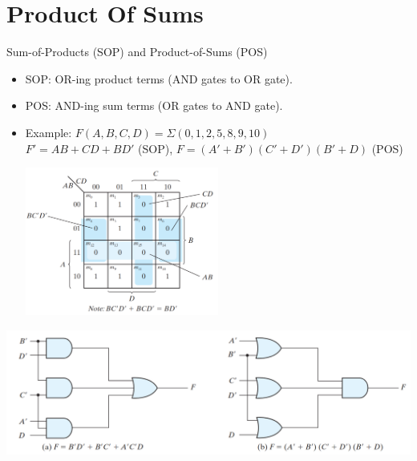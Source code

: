 \documentclass[Serif, 10pt, brown]{beamer}
\theoremstyle{example}
\theoremstyle{plain}
\begin{document}
\section[Product Of Sums]{Product Of Sums}
\begin{frame}{Sum-of-Products (SOP) and Product-of-Sums (POS)}
    \begin{itemize}
        \item SOP: OR-ing product terms (AND gates to OR gate).
        \item POS: AND-ing sum terms (OR gates to AND gate).
        \item Example: \( F(A,B,C,D) = \Sigma(0,1,2,5,8,9,10)\)\\\( F' = AB+CD+BD' \) (SOP), \( F = (A' + B') (C' + D' )(B'+D) \) (POS)
        \begin{center}
        \includegraphics[width=0.5\textwidth]{figs/sop.png}
    \end{center}
    \end{itemize}
\end{frame}
\begin{frame}
    \begin{center}
        \includegraphics[width=\textwidth]{figs/gate.png}
    \end{center}
\end{frame}
\end{document}
